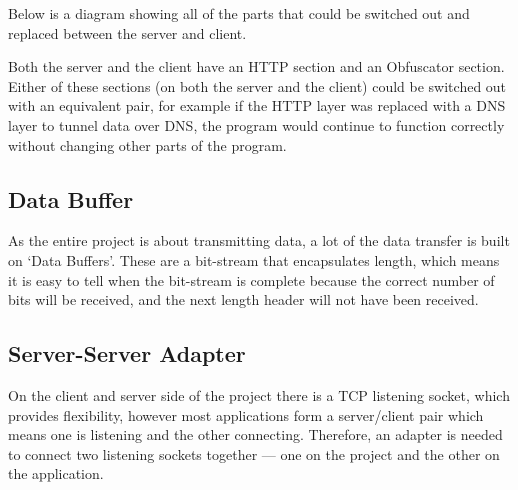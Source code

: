 Below is a diagram showing all of the parts that could be switched out and replaced between the server and client.
\begin{center}
\end{center}
Both the server and the client have an HTTP section and an Obfuscator section.
Either of these sections (on both the server and the client) could be switched out with an equivalent pair, for example if the HTTP layer was replaced with a DNS layer to tunnel data over DNS, the program would continue to function correctly without changing other parts of the program.

\subsection{Data Buffer}
As the entire project is about transmitting data, a lot of the data transfer is built on `Data Buffers'. These are a bit-stream that encapsulates length, which means it is easy to tell when the bit-stream is complete because the correct number of bits will be received, and the next length header will not have been received.

\subsection{Server-Server Adapter}
On the client and server side of the project there is a TCP listening socket, which provides flexibility, however most applications form a server/client pair which means one is listening and the other connecting.
Therefore, an adapter is needed to connect two listening sockets together --- one on the project and the other on the application.

